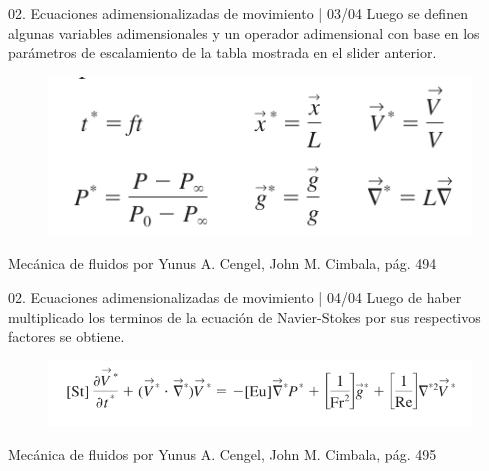 \begin{frame}{02. Ecuaciones adimensionalizadas de movimiento | 03/04}
\justifying
Luego se definen algunas variables adimensionales y un operador adimensional con base en los parámetros de escalamiento de la tabla mostrada en el slider anterior.
\begin{figure}[H]
\centering
\includegraphics[scale=0.3]{Section_Files/S3-imagenes-Jhon/0007.png}
\end{figure}
{\tiny Mecánica de fluidos por Yunus A. Cengel, John M. Cimbala, pág. 494}
\end{frame}

\begin{frame}{02. Ecuaciones adimensionalizadas de movimiento | 04/04}
\justifying
Luego de haber multiplicado los terminos de la ecuación de Navier-Stokes por sus respectivos factores se obtiene.
\begin{figure}[H]
\centering
\includegraphics[scale=0.3]{Section_Files/S3-imagenes-Jhon/0015.png}
\end{figure}
{\tiny Mecánica de fluidos por Yunus A. Cengel, John M. Cimbala, pág. 495}
\end{frame}



